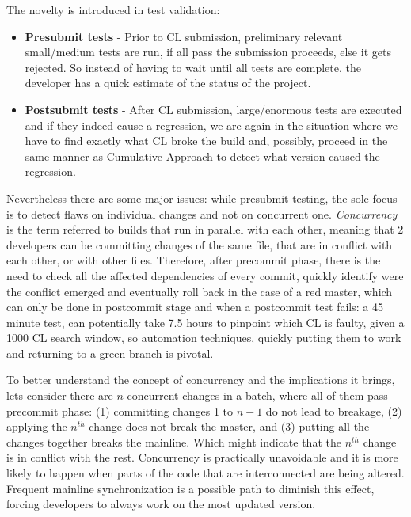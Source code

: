 The novelty is introduced in test validation: 

\begin{itemize}
	\item \textbf{Presubmit tests} - Prior to CL submission, preliminary relevant small/medium tests are run, if all pass the submission proceeds, else it gets rejected. So instead of having to wait until all tests are complete, the developer has a quick estimate of the status of the project.
	\item \textbf{Postsubmit tests} - After CL submission, large/enormous tests are executed and if they indeed cause a regression, we are again in the situation where we have to find exactly what CL broke the build and, possibly, proceed in the same manner as Cumulative Approach to detect what version caused the regression. \cite{Ziftci}
\end{itemize}

Nevertheless there are some major issues: while presubmit testing, the sole focus is to detect flaws on individual changes and not on concurrent one. \textit{Concurrency} is the term referred to builds that run in parallel with each other, meaning that 2 developers can be committing changes of the same file, that are in conflict with each other, or with other files. Therefore, after precommit phase, there is the need to check all the affected dependencies of every commit, quickly identify were the conflict emerged and eventually roll back in the case of a red master, which can only be done in postcommit stage \cite{Uber} and when a postcommit test fails: a 45 minute test, can potentially take 7.5 hours to pinpoint which CL is faulty, given a 1000 CL search window, so automation techniques, quickly putting them to work and returning to a green branch is pivotal. \cite{Ziftci}

To better understand the concept of concurrency and the implications it brings, lets consider there are $n$ concurrent changes in a batch, where all of them pass precommit phase: (1) committing changes 1 to $n-1$ do not lead to breakage, (2) applying the $n^{th}$ change does not break the master, and (3) putting all the changes together breaks the mainline. Which might indicate that  the $n^{th}$ change is in conflict with the rest. Concurrency is practically unavoidable and it is more likely to happen when parts of the code that are interconnected are being altered. Frequent mainline synchronization is a possible path to diminish this effect, forcing developers to always work on the most updated version.\cite{Uber} 

